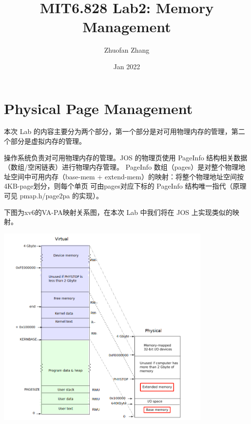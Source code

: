 \documentclass[12pt, letterpaper]{report}
\title{MIT6.828 Lab2: Memory Management}
\author{Zhuofan Zhang}
\date{Jan 2022}
\begin{document}
\maketitle
\renewcommand\contentsname{\Huge Contents}
\tableofcontents{}


\newpage
{}
\chapter[\Large Physical Page Management]{Physical Page Management}
本次 Lab 的内容主要分为两个部分，第一个部分是对可用物理内存的管理，第二个部分是虚拟内存的管理。\par
操作系统负责对可用物理内存的管理。JOS 的物理页使用 PageInfo 结构相关数据（数组/空闲链表）进行物理内存管理。
PageInfo 数组（pages）是对整个物理地址空间中可用内存（base-mem + extend-mem）的映射：将整个物理地址空间按4KB-page划分，则每个单页
可由pages对应下标的 PageInfo 结构唯一指代（原理可见 pmap.h/page2pa 的实现）。\par
下图为xv6的VA-PA映射关系图，在本次 Lab 中我们将在 JOS 上实现类似的映射。 
\quad \par 
\includegraphics[width=0.8\textwidth]{layout-of-vapa}
\newpage
\end{document}
